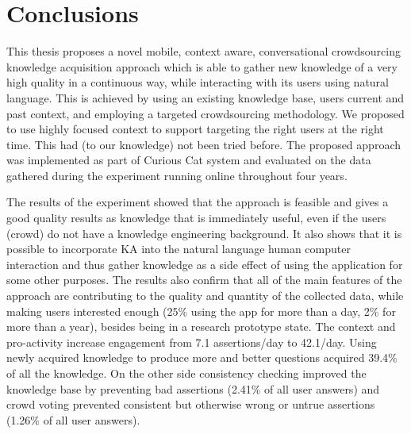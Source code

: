 % 
\chapter{Conclusions}
\label{chapter:conclusions}
This thesis proposes a novel mobile, context aware,
conversational crowdsourcing knowledge acquisition approach which is able to 
gather new knowledge of a very high quality in a continuous way, while 
interacting with its users using natural language. This is achieved by using an
existing knowledge base, users current and past context, and employing a 
targeted crowdsourcing methodology. We proposed to use highly focused context 
to support targeting the right users 
at the right time. This had (to our knowledge) not been tried before. The
proposed approach was implemented as part of Curious Cat system and evaluated 
on the data gathered during the experiment running online throughout four 
years. 

The results of the experiment showed that the approach is feasible and gives a 
good quality results as knowledge that is immediately useful, even if the users 
(crowd) do not have a knowledge engineering background. It also shows that
it is possible to incorporate KA into the natural language human computer interaction and 
thus gather knowledge as a side effect of using the application for some other
purposes. The results also confirm that all of the main features 
of the approach are contributing to the quality and quantity of the collected 
data, while making users interested enough (25\% using the app for more than a 
day, 2\% for more than a year), besides being in a research prototype state. 
The context and pro-activity increase engagement from 7.1 assertions/day to 
42.1/day. Using newly acquired knowledge to produce more and better questions 
acquired 39.4\% of all the knowledge. On the other side consistency checking 
improved the knowledge base by preventing bad assertions (2.41\% of all user 
answers) and crowd voting prevented consistent but otherwise wrong or untrue 
assertions (1.26\% of all user answers).

